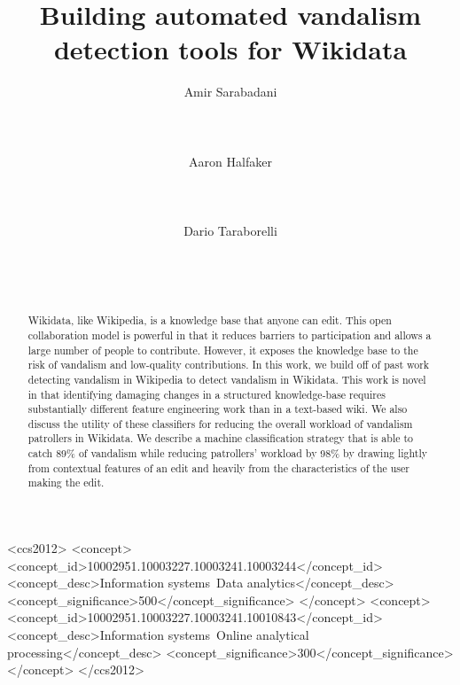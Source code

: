 \documentclass{sig-alternate}
\begin{document}

\title{Building automated vandalism detection tools for Wikidata}

\author{
\alignauthor Amir Sarabadani\\
\\
\\
\\
\alignauthor Aaron Halfaker\\
\\
\\
\\
\alignauthor Dario Taraborelli\\
\\
\\
\\
}

\maketitle
\begin{abstract}
Wikidata, like Wikipedia, is a knowledge base that anyone can edit.  This open collaboration model is powerful in that it reduces barriers to participation and allows a large number of people to contribute. However, it exposes the knowledge base to the risk of vandalism and low-quality contributions.  In this work, we build off of past work detecting vandalism in Wikipedia to detect vandalism in Wikidata.  This work is novel in that identifying damaging changes in a structured knowledge-base requires substantially different feature engineering work than in a text-based wiki.  We also discuss the utility of these classifiers for reducing the overall workload of vandalism patrollers in Wikidata.  We describe a machine classification strategy that is able to catch 89\% of vandalism while reducing patrollers' workload by 98\% by drawing lightly from contextual features of an edit and heavily from the characteristics of the user making the edit.
\end{abstract}

\begin{CCSXML}
<ccs2012>
<concept>
<concept_id>10002951.10003227.10003241.10003244</concept_id>
<concept_desc>Information systems~Data analytics</concept_desc>
<concept_significance>500</concept_significance>
</concept>
<concept>
<concept_id>10002951.10003227.10003241.10010843</concept_id>
<concept_desc>Information systems~Online analytical processing</concept_desc>
<concept_significance>300</concept_significance>
</concept>
</ccs2012>
\end{CCSXML}
\end{document}
